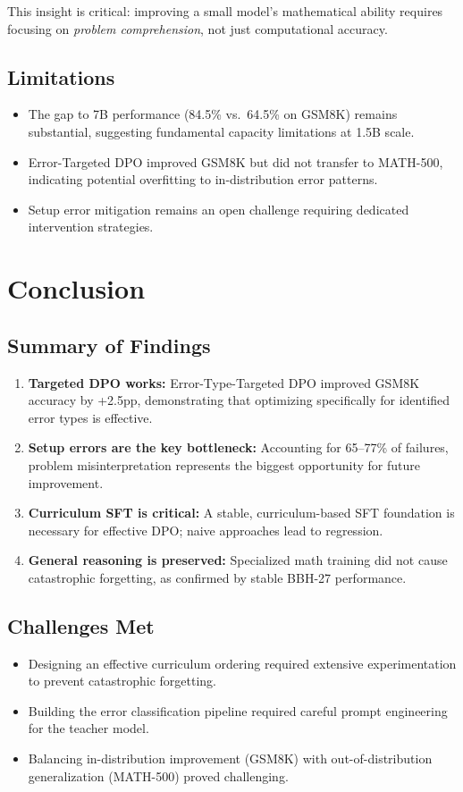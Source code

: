 \documentclass{article}
\begin{document}
This insight is critical: improving a small model's mathematical ability requires focusing on \textit{problem comprehension}, not just computational accuracy.

\subsection{Limitations}
\begin{itemize}[noitemsep]
    \item The gap to 7B performance (84.5\% vs.\ 64.5\% on GSM8K) remains substantial, suggesting fundamental capacity limitations at 1.5B scale.
    \item Error-Targeted DPO improved GSM8K but did not transfer to MATH-500, indicating potential overfitting to in-distribution error patterns.
    \item Setup error mitigation remains an open challenge requiring dedicated intervention strategies.
\end{itemize}

\section{Conclusion}

\subsection{Summary of Findings}
\begin{enumerate}[noitemsep]
    \item \textbf{Targeted DPO works:} Error-Type-Targeted DPO improved GSM8K accuracy by +2.5pp, demonstrating that optimizing specifically for identified error types is effective.
    \item \textbf{Setup errors are the key bottleneck:} Accounting for 65--77\% of failures, problem misinterpretation represents the biggest opportunity for future improvement.
    \item \textbf{Curriculum SFT is critical:} A stable, curriculum-based SFT foundation is necessary for effective DPO; naive approaches lead to regression.
    \item \textbf{General reasoning is preserved:} Specialized math training did not cause catastrophic forgetting, as confirmed by stable BBH-27 performance.
\end{enumerate}

\subsection{Challenges Met}
\begin{itemize}[noitemsep]
    \item Designing an effective curriculum ordering required extensive experimentation to prevent catastrophic forgetting.
    \item Building the error classification pipeline required careful prompt engineering for the teacher model.
    \item Balancing in-distribution improvement (GSM8K) with out-of-distribution generalization (MATH-500) proved challenging.
\end{itemize}
\end{document}
